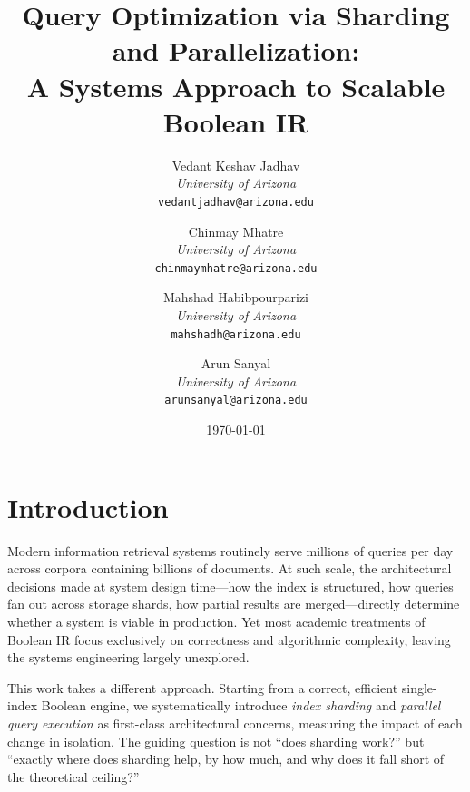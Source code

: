 \documentclass[twocolumn, 10pt]{article}
\title{\textbf{Query Optimization via Sharding and Parallelization:\\
A Systems Approach to Scalable Boolean IR}}
\author{
    Vedant Keshav Jadhav\\
    \textit{University of Arizona}\\
    \texttt{vedantjadhav@arizona.edu}
	\and
	Chinmay Mhatre\\
    \textit{University of Arizona}\\
    \texttt{chinmaymhatre@arizona.edu}
	\and
	Mahshad Habibpourparizi\\
    \textit{University of Arizona}\\
    \texttt{mahshadh@arizona.edu}
	\and
	Arun Sanyal\\
    \textit{University of Arizona}\\
    \texttt{arunsanyal@arizona.edu}
}
\date{\today}
\begin{document}

\section{Introduction}

Modern information retrieval systems routinely serve millions of queries per
day across corpora containing billions of documents. At such scale, the
architectural decisions made at system design time---how the index is
structured, how queries fan out across storage shards, how partial results
are merged---directly determine whether a system is viable in production.
Yet most academic treatments of Boolean IR focus exclusively on correctness
and algorithmic complexity, leaving the systems engineering largely
unexplored.

This work takes a different approach. Starting from a correct, efficient
single-index Boolean engine, we systematically introduce \textit{index
sharding} and \textit{parallel query execution} as first-class architectural
concerns, measuring the impact of each change in isolation. The guiding
question is not ``does sharding work?'' but ``exactly where does sharding
help, by how much, and why does it fall short of the theoretical ceiling?''
\end{document}
